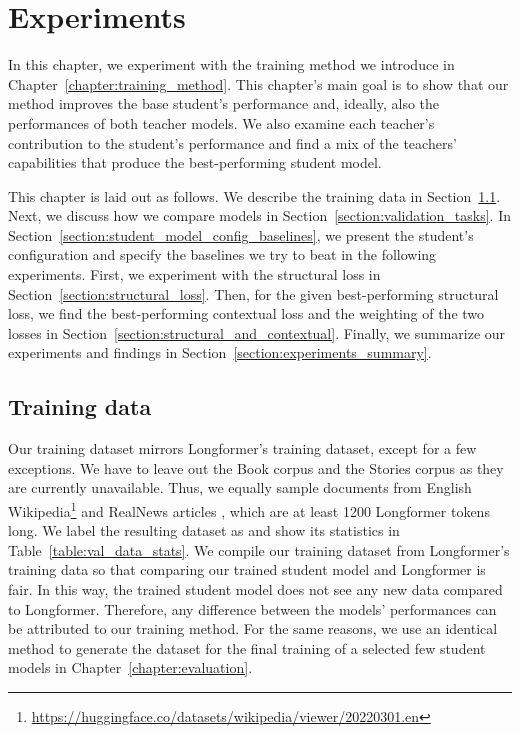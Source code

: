 \chapter{Experiments}\label{chapter:experiments}

In this chapter, we experiment with the training method we introduce in
Chapter~\ref{chapter:training_method}. This chapter's main goal is to show that
our method improves the base student's performance and, ideally, also the
performances of both teacher models. We also examine each teacher's
contribution to the student's performance and find a mix of the teachers'
capabilities that produce the best-performing student model.

This chapter is laid out as follows. We describe the training data in
Section~\ref{section:val_training_data}. Next, we discuss how we compare models
in Section~\ref{section:validation_tasks}. In
Section~\ref{section:student_model_config_baselines}, we present the student's
configuration and specify the baselines we try to beat in the following
experiments. First, we experiment with the structural loss in
Section~\ref{section:structural_loss}. Then, for the given best-performing
structural loss, we find the best-performing contextual loss and the weighting
of the two losses in Section~\ref{section:structural_and_contextual}. Finally,
we summarize our experiments and findings in
Section~\ref{section:experiments_summary}.

\section{Training data}\label{section:val_training_data}

Our training dataset mirrors Longformer's training dataset, except for a few
exceptions. We have to leave out the Book corpus \citep{zhu2015aligning} and
the Stories corpus \citep{trinh2018simple} as they are currently unavailable.
Thus, we equally sample documents from English
Wikipedia\footnote{\url{https://huggingface.co/datasets/wikipedia/viewer/20220301.en}}
and RealNews articles \citep{zellers2019defending}, which are at least 1200
Longformer tokens long. We label the resulting dataset as 
and show its statistics in Table~\ref{table:val_data_stats}. We compile our
training dataset from Longformer's training data so that comparing our trained
student model and Longformer is fair. In this way, the trained student model
does not see any new data compared to Longformer. Therefore, any difference
between the models' performances can be attributed to our training method. For
the same reasons, we use an identical method to generate the dataset
 for the final training of a selected few student models in
Chapter~\ref{chapter:evaluation}.

